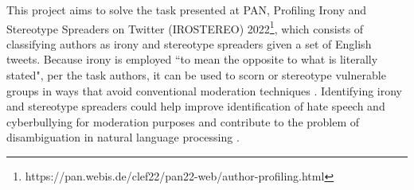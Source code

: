 This project aims to solve the task presented at PAN, Profiling Irony and Stereotype Spreaders on Twitter (IROSTEREO) 2022\footnote{https://pan.webis.de/clef22/pan22-web/author-profiling.html}, which consists of classifying authors as irony and stereotype spreaders given a set of English tweets. Because irony is employed ``to mean the opposite to what is literally stated", per the task authors, it can be used to scorn or stereotype vulnerable groups in ways that avoid conventional moderation techniques \cite{greene2019deplorable}. Identifying irony and stereotype spreaders could help improve identification of hate speech and cyberbullying for moderation purposes \cite{cyberbullying, waseem2016hateful} and contribute to the problem of disambiguation in natural language processing \cite{reyes2012humor, sarcasm_detection}. 

